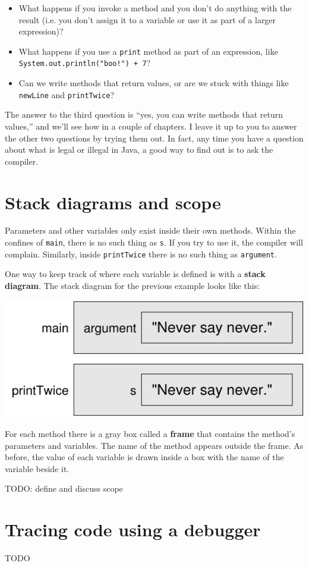 \begin{itemize}

\item What happens if you invoke a method and you don't do anything with the result (i.e. you don't assign it to a variable or use it as part of a larger expression)?

\item What happens if you use a {\tt print} method as part of an expression, like {\tt System.out.println("boo!") + 7}?

\item Can we write methods that return values, or are we stuck with things like {\tt newLine} and {\tt printTwice}?

\end{itemize}

The answer to the third question is ``yes, you can write methods that return values,'' and we'll see how in a couple of chapters.
I leave it up to you to answer the other two questions by trying them out.
In fact, any time you have a question about what is legal or illegal in Java, a good way to find out is to ask the compiler.


\section{Stack diagrams and scope}
\label{stack}


Parameters and other variables only exist inside their own methods.
Within the confines of {\tt main}, there is no such thing as {\tt s}.
If you try to use it, the compiler will complain.
Similarly, inside {\tt printTwice} there is no such thing as {\tt argument}.

One way to keep track of where each variable is defined is with a {\bf stack diagram}.
The stack diagram for the previous example looks like this:

\includegraphics{stack.pdf}

For each method there is a gray box called a {\bf frame} that contains the method's parameters and variables.
The name of the method appears outside the frame.
As before, the value of each variable is drawn inside a box with the name of the variable beside it.

TODO: define and discuss scope


\section{Tracing code using a debugger}

TODO
